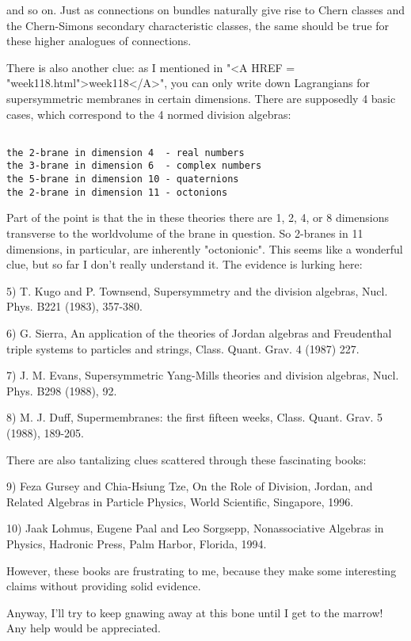 and so on.  Just as connections on bundles naturally give rise to 
Chern classes and the Chern-Simons secondary characteristic classes, 
the same should be true for these higher analogues of connections. 
 
There is also another clue: as I mentioned in "<A HREF =
"week118.html">week118</A>", you can only write down Lagrangians
for supersymmetric membranes in certain dimensions.  There are
supposedly 4 basic cases, which correspond to the 4 normed division
algebras:


\begin{verbatim}

the 2-brane in dimension 4  - real numbers
the 3-brane in dimension 6  - complex numbers
the 5-brane in dimension 10 - quaternions
the 2-brane in dimension 11 - octonions
\end{verbatim}
    
Part of the point is that the in these theories there are 1, 2, 4, 
or 8 dimensions transverse to the worldvolume of the brane in question.
So 2-branes in 11 dimensions, in particular, are inherently "octonionic". 
This seems like a wonderful clue, but so far I don't really understand it.   
The evidence is lurking here: 
 
5) T. Kugo and P. Townsend, Supersymmetry and the division algebras, 
Nucl. Phys. B221 (1983), 357-380. 
 
6) G. Sierra, An application of the theories of Jordan algebras and 
Freudenthal triple systems to particles and strings, Class. Quant.  
Grav. 4 (1987) 227. 
 
7) J. M. Evans, Supersymmetric Yang-Mills theories and division algebras, 
Nucl. Phys. B298 (1988), 92. 
 
8) M. J. Duff, Supermembranes: the first fifteen weeks, Class. Quant. 
Grav. 5 (1988), 189-205. 
 
There are also tantalizing clues scattered through these fascinating 
books: 
 
9) Feza Gursey and Chia-Hsiung Tze, On the Role of Division, Jordan, and 
Related Algebras in Particle Physics, World Scientific, Singapore, 1996. 
 
10) Jaak Lohmus, Eugene Paal and Leo Sorgsepp, Nonassociative Algebras 
in Physics, Hadronic Press, Palm Harbor, Florida, 1994. 
 
However, these books are frustrating to me, because they make some 
interesting claims without providing solid evidence.   
 
Anyway, I'll try to keep gnawing away at this bone until I get to the 
marrow!   Any help would be appreciated.
 

